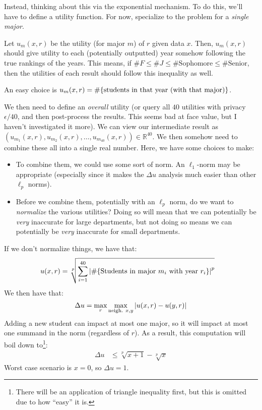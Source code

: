 \documentclass{article}
\theoremstyle{definition}
\begin{document}
\begin{itemize}
Instead, thinking about this via the exponential mechanism.
To do this, we'll have to define a utility function.
For now, specialize to the problem for a \emph{single major}.

Let $u_m(x,r)$ be the utility (for major $m$) of $r$ given data $x$.
Then, $u_m(x,r)$ should give utility to each (potentially outputted) year somehow following the true rankings of the years.
This means, if $\# F \leq \# J \leq \#\text{Sophomore} \leq \#\text{Senior}$, then the utilities of each result should follow this inequality as well.

An easy choice is $u_m(x,r) = \#\Bqty{\text{students in that year (with that major)}}$.

We then need to define an \emph{overall} utility (or query all $40$ utilities with privacy $\epsilon/40$, and then post-process the results.
This seems bad at face value, but I haven't investigated it more).
We can view our intermediate result as $(u_{m_1}(x,r),u_{m_2}(x,r),\dots,u_{m_{40}}(x,r))\in\mathbb{R}^{40}$.
We then somehow need to combine these all into a single real number.
Here, we have some choices to make:
\begin{itemize}
\item To combine them, we could use some sort of norm.
An $\ell_1$-norm may be appropriate (especially since it makes the $\Delta u$ analysis much easier than other $\ell_p$ norms).
\item Before we combine them, potentially with an $\ell_p$ norm, do we want to \emph{normalize} the various utilities?
Doing so will mean that we can potentially be \emph{very} inaccurate for large departments, but not doing so means we can potentially be \emph{very} inaccurate for small departments.
\end{itemize}
If we don't normalize things, we have that:
\begin{align*}
u(x,r) &= \sqrt[p]{\sum_{i = 1}^{40} \abs{\#\Bqty{\text{Students in major }m_i\text{ with year }r_i}}^p}
\end{align*}
We then have that:
\begin{equation}
\Delta u = \max_r \max_{\text{neigh. }x,y}\abs{u(x,r) - u(y,r)}
\end{equation}
Adding a new student can impact at most one major, so it will impact at most one summand in the norm (regardless of $r$).
As a result, this computation will boil down to\footnote{There will be an application of triangle inequality first, but this is omitted due to how ``easy'' it is.}:
\begin{align*}
\Delta u &\leq \sqrt[p]{x+1} -\sqrt[p]{x}
\end{align*}
Worst case scenario is $x = 0$, so $\Delta u = 1$.


\end{itemize}
\end{document}
